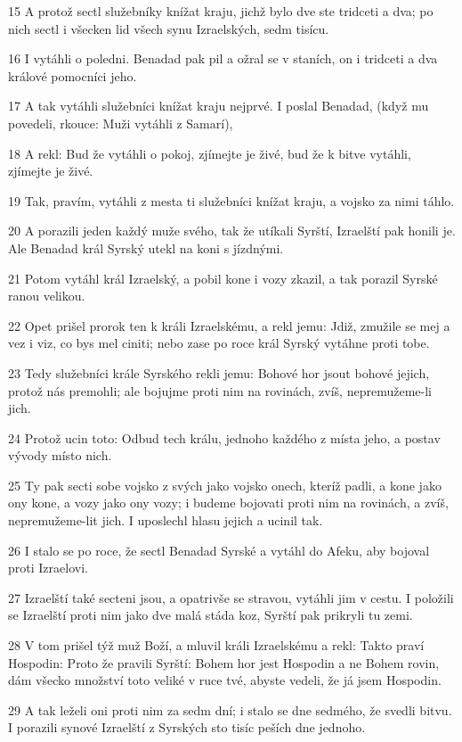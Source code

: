 \par 15 A protož sectl služebníky knížat kraju, jichž bylo dve ste tridceti a dva; po nich sectl i všecken lid všech synu Izraelských, sedm tisícu.
\par 16 I vytáhli o poledni. Benadad pak pil a ožral se v staních, on i tridceti a dva králové pomocníci jeho.
\par 17 A tak vytáhli služebníci knížat kraju nejprvé. I poslal Benadad, (když mu povedeli, rkouce: Muži vytáhli z Samarí),
\par 18 A rekl: Bud že vytáhli o pokoj, zjímejte je živé, bud že k bitve vytáhli, zjímejte je živé.
\par 19 Tak, pravím, vytáhli z mesta ti služebníci knížat kraju, a vojsko za nimi táhlo.
\par 20 A porazili jeden každý muže svého, tak že utíkali Syrští, Izraelští pak honili je. Ale Benadad král Syrský utekl na koni s jízdnými.
\par 21 Potom vytáhl král Izraelský, a pobil kone i vozy zkazil, a tak porazil Syrské ranou velikou.
\par 22 Opet prišel prorok ten k králi Izraelskému, a rekl jemu: Jdiž, zmužile se mej a vez i viz, co bys mel ciniti; nebo zase po roce král Syrský vytáhne proti tobe.
\par 23 Tedy služebníci krále Syrského rekli jemu: Bohové hor jsout bohové jejich, protož nás premohli; ale bojujme proti nim na rovinách, zvíš, nepremužeme-li jich.
\par 24 Protož ucin toto: Odbud tech králu, jednoho každého z místa jeho, a postav vývody místo nich.
\par 25 Ty pak secti sobe vojsko z svých jako vojsko onech, kteríž padli, a kone jako ony kone, a vozy jako ony vozy; i budeme bojovati proti nim na rovinách, a zvíš, nepremužeme-lit jich. I uposlechl hlasu jejich a ucinil tak.
\par 26 I stalo se po roce, že sectl Benadad Syrské a vytáhl do Afeku, aby bojoval proti Izraelovi.
\par 27 Izraelští také secteni jsou, a opatrivše se stravou, vytáhli jim v cestu. I položili se Izraelští proti nim jako dve malá stáda koz, Syrští pak prikryli tu zemi.
\par 28 V tom prišel týž muž Boží, a mluvil králi Izraelskému a rekl: Takto praví Hospodin: Proto že pravili Syrští: Bohem hor jest Hospodin a ne Bohem rovin, dám všecko množství toto veliké v ruce tvé, abyste vedeli, že já jsem Hospodin.
\par 29 A tak leželi oni proti nim za sedm dní; i stalo se dne sedmého, že svedli bitvu. I porazili synové Izraelští z Syrských sto tisíc peších dne jednoho.
